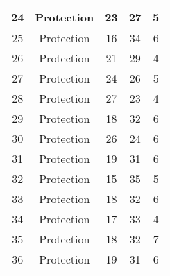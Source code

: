 \documentclass[results.tex]{subfiles}
\begin{document}
\begin{center}
\begin{tabular}{| c || c | c | c | c |}
            \hline
            24                      & Protection                   & 23                     & 27                      & 5                    \\
            \hline
            25                      & Protection                   & 16                     & 34                      & 6                    \\
            \hline
            26                      & Protection                   & 21                     & 29                      & 4                    \\
            \hline
            27                      & Protection                   & 24                     & 26                      & 5                    \\
            \hline
            28                      & Protection                   & 27                     & 23                      & 4                    \\
            \hline
            29                      & Protection                   & 18                     & 32                      & 6                    \\
            \hline
            30                      & Protection                   & 26                     & 24                      & 6                    \\
            \hline
            31                      & Protection                   & 19                     & 31                      & 6                    \\
            \hline
            32                      & Protection                   & 15                     & 35                      & 5                    \\
            \hline
            33                      & Protection                   & 18                     & 32                      & 6                    \\
            \hline
            34                      & Protection                   & 17                     & 33                      & 4                    \\
            \hline
            35                      & Protection                   & 18                     & 32                      & 7                    \\
            \hline
            36                      & Protection                   & 19                     & 31                      & 6                    \\

\end{tabular}
\end{center}
\end{document}
